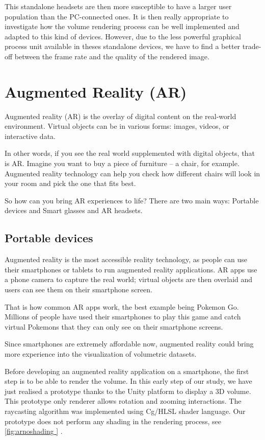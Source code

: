 This standalone headsets are then more susceptible to have a larger user population than the PC-connected ones. It is then really appropriate to investigate how the volume rendering process can be well implemented and adapted to this kind of devices. However, due to the less powerful graphical process unit available in theses standalone devices, we have to find a better trade-off between the frame rate and the quality of the rendered image. 


\section{ Augmented Reality (AR)}

Augmented reality (AR) is the overlay of digital content on the real-world environment. Virtual objects can be in various forms: images, videos, or interactive data.


In other words, if you see the real world supplemented with digital objects, that is AR. Imagine you want to buy a piece of furniture – a chair, for example. Augmented reality technology can help you check how different chairs will look in your room and pick the one that fits best.


So how can you bring AR experiences to life? There are two main ways: Portable devices and Smart glasses and AR headsets. 


\subsection{Portable devices}

Augmented reality is the most accessible reality technology, as people can use their smartphones or tablets to run augmented reality applications. AR apps use a phone camera to capture the real world; virtual objects are then overlaid and users can see them on their smartphone screen.


That is how common AR apps work, the best example being Pokemon Go. Millions of people have used their smartphones to play this game and catch virtual Pokemons that they can only see on their smartphone screens. 


Since smartphones are extremely affordable now, augmented reality could bring more experience into the visualization of volumetric datasets. 


Before developing an augmented reality application on a smartphone, the first step is to be able to render the volume. In this early step of our study, we have just realised a prototype thanks to the Unity platform to display a 3D volume. This prototype only renderer allows  rotation and zooming interactions. The raycasting algorithm was implemented using Cg/HLSL shader language. Our prototype does not  perform any shading in the rendering process, see \autoref{fig:arnoshading } . 

